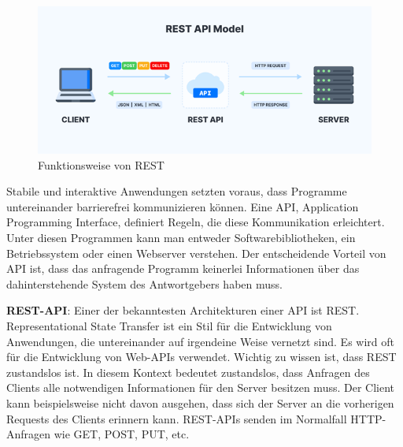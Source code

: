 \begin{figure}[h]
    \centering
    \includegraphics[scale=0.9]{sections/cloud-computing/images/rest-api.png}
    \caption{Funktionsweise von REST}
\end{figure}

Stabile und interaktive Anwendungen setzten voraus, dass Programme untereinander barrierefrei kommunizieren können. Eine API, Application Programming Interface, definiert Regeln, die diese Kommunikation erleichtert. Unter diesen Programmen kann man entweder Softwarebibliotheken, ein Betriebssystem oder einen Webserver verstehen.
Der entscheidende Vorteil von API ist, dass das anfragende Programm keinerlei Informationen über das dahinterstehende System des Antwortgebers haben muss.

\textbf{REST-API}: Einer der bekanntesten Architekturen einer API ist REST. Representational State Transfer ist ein Stil für die Entwicklung von Anwendungen, die untereinander auf irgendeine Weise vernetzt sind. Es wird oft für die Entwicklung von Web-APIs verwendet.
Wichtig zu wissen ist, dass REST zustandslos ist. In diesem Kontext bedeutet zustandslos, dass Anfragen des Clients alle notwendigen Informationen für den Server besitzen muss. Der Client kann beispielsweise nicht davon ausgehen, dass sich der Server an die vorherigen Requests des Clients erinnern kann.
REST-APIs senden im Normalfall HTTP-Anfragen wie GET, POST, PUT, etc.
